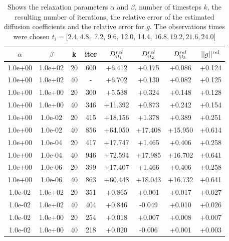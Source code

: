 \documentclass[11pt,a4paper]{article}
\begin{document}
  





 

 








\begin{table}
\centering
\caption{ Shows the relaxation parameters $\alpha$ and $\beta$, number of timesteps $k$, the resulting number of iterations, the relative error of the estimated diffusion coefficients and the relative error for $g$. The observations times were chosen $ t_i=[2.4, 4.8,$ 7.2, 9.6, 12.0, 14.4, $16.8, 19.2, 21.6, 24.0]$ }
\begin{tabular}{*{8}c}
$\alpha$ & $\beta$ & k & iter & $ D_{\Omega_1}\sp{rel}$& $D_{\Omega_2}\sp{rel} $ & $D_{\Omega_3}\sp{rel} $&$|| g ||\sp{rel} $ \\
\hline
 1.0e+00 	 & 1.0e+02 	 & 20 & 600 	 & +6.412 & +0.175 & +0.086 & +0.124 \\
 1.0e+00 	 & 1.0e+02 	 & 40 &  -   & +6.702 & +0.130 & +0.082 & +0.125 \\  
 1.0e+00 	 & 1.0e+00 	 & 20 & 300 	 & +5.538 & +0.324 & +0.148 & +0.128 \\ 
 1.0e+00 	 & 1.0e+00 	 & 40 & 346 	 & +11.392 & +0.873 & +0.242 & +0.154 \\ 
 1.0e+00 	 & 1.0e-02 	 & 20 & 415 	 & +18.156 & +1.378  & +0.389  & +0.251 \\ 
 1.0e+00 	 & 1.0e-02 	 & 40 & 856 	 & +64.050 & +17.408 & +15.950 & +0.614 \\ 
 1.0e+00 	 & 1.0e-04 	 & 20 & 417 	 & +17.747 & +1.465  & +0.406  & +0.258 \\ 
 1.0e+00 	 & 1.0e-04 	 & 40 & 946 	 & +72.594 & +17.985 & +16.702 & +0.641 \\
 1.0e+00 	 & 1.0e-06 	 & 20 & 399 	 & +17.407 & +1.466  & +0.406  & +0.258 \\ 
 1.0e+00 	 & 1.0e-06 	 & 40 & 863 	 & +60.448 & +18.043 & +16.732 & +0.641 \\
 \hline
 1.0e-02 	 & 1.0e+02 	 & 20 & 351 	 & +0.865 & +0.001 & +0.017 & +0.027 \\ 
 1.0e-02 	 & 1.0e+02 	 & 40 & 404 	 & +0.846 & -0.049 & +0.010 & +0.026 \\ 
 1.0e-02 	 & 1.0e+00 	 & 20 & 254 	 & +0.018 & +0.007 & +0.008 & +0.007 \\ 
 1.0e-02 	 & 1.0e+00 	 & 40 & 218 	 & +0.020 & -0.006 & +0.001 & +0.003 \\ 

\end{tabular}
\end{table}
\end{document}
